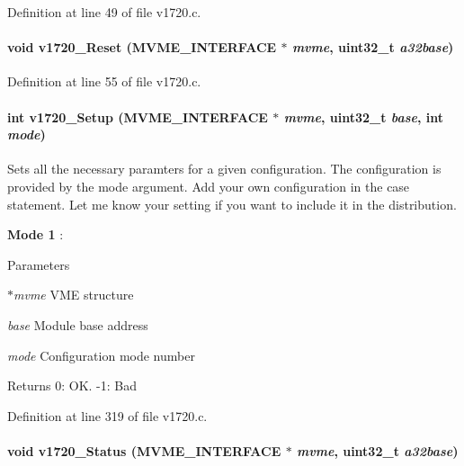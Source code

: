 Definition at line 49 of file v1720.c.
\paragraph[{v1720\_\-Reset}]{\setlength{\rightskip}{0pt plus 5cm}void v1720\_\-Reset ({\bf MVME\_\-INTERFACE} $\ast$ {\em mvme}, \/  uint32\_\-t {\em a32base})}\hfill\label{v1720drv_8h_a609ce91c22277511e1668db1941ec3ec}


Definition at line 55 of file v1720.c.
\paragraph[{v1720\_\-Setup}]{\setlength{\rightskip}{0pt plus 5cm}int v1720\_\-Setup ({\bf MVME\_\-INTERFACE} $\ast$ {\em mvme}, \/  uint32\_\-t {\em base}, \/  int {\em mode})}\hfill\label{v1720drv_8h_ad79d55b32ab0e0c0c849267d56eaf05a}
Sets all the necessary paramters for a given configuration. The configuration is provided by the mode argument. Add your own configuration in the case statement. Let me know your setting if you want to include it in the distribution.
\begin{DoxyItemize}
\item {\bfseries Mode 1} :
\end{DoxyItemize}


\begin{DoxyParams}{Parameters}
\item[{\em $\ast$mvme}]VME structure \item[{\em base}]Module base address \item[{\em mode}]Configuration mode number \end{DoxyParams}
\begin{DoxyReturn}{Returns}
0: OK. -\/1: Bad 
\end{DoxyReturn}


Definition at line 319 of file v1720.c.
\paragraph[{v1720\_\-Status}]{\setlength{\rightskip}{0pt plus 5cm}void v1720\_\-Status ({\bf MVME\_\-INTERFACE} $\ast$ {\em mvme}, \/  uint32\_\-t {\em a32base})}\hfill\label{v1720drv_8h_aec3d9c8fe2d5a2ab57a1d7ba80df28a7}


